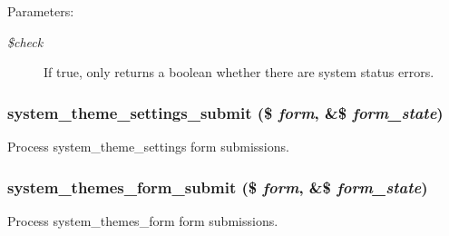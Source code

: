 \begin{Desc}
\item[Parameters:]
\begin{description}
\item[{\em \$check}]If true, only returns a boolean whether there are system status errors. \end{description}
\end{Desc}
\hypertarget{system_8admin_8inc_5403622cfdf9642a628637c4b4836c72}{
\subsubsection[{system\_\-theme\_\-settings\_\-submit}]{\setlength{\rightskip}{0pt plus 5cm}system\_\-theme\_\-settings\_\-submit (\$ {\em form}, \/  \&\$ {\em form\_\-state})}}
\label{system_8admin_8inc_5403622cfdf9642a628637c4b4836c72}


Process system\_\-theme\_\-settings form submissions. \hypertarget{system_8admin_8inc_befe4cab3ed3a80f4d37af3eb74df33f}{
\subsubsection[{system\_\-themes\_\-form\_\-submit}]{\setlength{\rightskip}{0pt plus 5cm}system\_\-themes\_\-form\_\-submit (\$ {\em form}, \/  \&\$ {\em form\_\-state})}}
\label{system_8admin_8inc_befe4cab3ed3a80f4d37af3eb74df33f}


Process system\_\-themes\_\-form form submissions. 